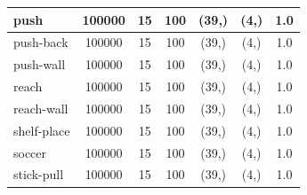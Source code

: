 \documentclass{article}
\theoremstyle{plain}
\theoremstyle{definition}
\theoremstyle{remark}
\begin{document}
\begin{table}[]
{\begin{tabular}{|l|c|c|c|c|c|c|}
push                                & 100000                                        & 15                                                   & 100                                             & (39,)                                           & (4,) & 1.0                                            \\ \hline
push-back                           & 100000                                        & 15                                                   & 100                                             & (39,)                                           & (4,) & 1.0                                            \\ \hline
push-wall                           & 100000                                        & 15                                                   & 100                                             & (39,)                                           & (4,) & 1.0                                            \\ \hline
reach                               & 100000                                        & 15                                                   & 100                                             & (39,)                                           & (4,) & 1.0                                            \\ \hline
reach-wall                          & 100000                                        & 15                                                   & 100                                             & (39,)                                           & (4,) & 1.0                                            \\ \hline
shelf-place                         & 100000                                        & 15                                                   & 100                                             & (39,)                                           & (4,) & 1.0                                            \\ \hline
soccer                              & 100000                                        & 15                                                   & 100                                             & (39,)                                           & (4,) & 1.0                                            \\ \hline
stick-pull                          & 100000                                        & 15                                                   & 100                                             & (39,)                                           & (4,) & 1.0                                            \\ \hline

\end{tabular}}
\end{table}
\end{document}
